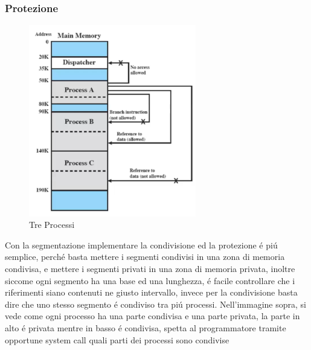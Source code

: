     \subsubsection{Protezione}
    \begin{figure}[H]
        \centering
        \includegraphics[width=0.65\textwidth]{immagini/Protezione}
        \caption{Tre Processi}
    \end{figure}
    Con la segmentazione implementare la condivisione ed la protezione é piú semplice, perché basta mettere i segmenti
    condivisi in una zona di memoria condivisa, e mettere i segmenti privati in una zona di memoria privata, inoltre
    siccome ogni segmento ha una base ed una lunghezza, é facile controllare che i riferimenti siano contenuti ne giusto intervallo,
    invece per la condivisione basta dire che uno stesso segmento é condiviso tra piú processi.
    Nell'immagine sopra, si vede come ogni processo ha una parte condivisa e una parte privata, la parte in alto é
    privata mentre in basso é condivisa, spetta al programmatore tramite opportune system call quali parti dei processi sono condivise
